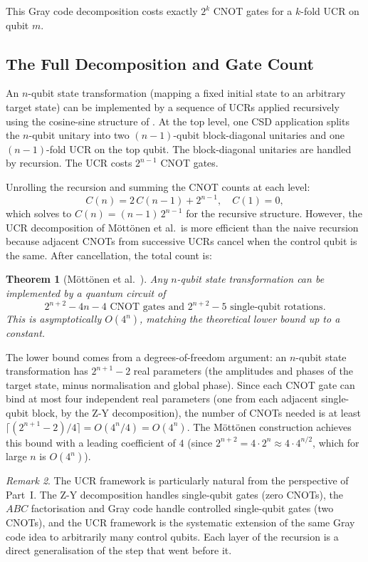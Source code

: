 \documentclass[12pt, a4paper, oneside]{report}
\theoremstyle{plain}
\newtheorem{theorem}{Theorem}[chapter]
\theoremstyle{definition}
\theoremstyle{remark}
\newtheorem{remark}[theorem]{Remark}
\begin{document}
This Gray code decomposition costs exactly $2^k$ CNOT gates for a $k$-fold UCR on qubit $m$.

\subsection{The Full Decomposition and Gate Count}

An $n$-qubit state transformation (mapping a fixed initial state to an arbitrary target
state) can be implemented by a sequence of UCRs applied recursively using the cosine-sine
structure of . At the top level, one CSD application splits the $n$-qubit
unitary into two $(n-1)$-qubit block-diagonal unitaries and one $(n-1)$-fold UCR on the
top qubit. The block-diagonal unitaries are handled by recursion. The UCR costs $2^{n-1}$
CNOT gates.

Unrolling the recursion and summing the CNOT counts at each level:
\[
  C(n) = 2\,C(n-1) + 2^{n-1}, \quad C(1) = 0,
\]
which solves to $C(n) = (n-1)\,2^{n-1}$ for the recursive structure. However, the UCR
decomposition of Möttönen et al.\ is more efficient than the naive recursion because
adjacent CNOTs from successive UCRs cancel when the control qubit is the same. After
cancellation, the total count is:

\begin{theorem}[Möttönen et al.~\cite{mottonen2004}]
\label{thm:mottonen}
Any $n$-qubit state transformation can be implemented by a quantum circuit of
\[
  2^{n+2} - 4n - 4 \text{ CNOT gates and } 2^{n+2} - 5 \text{ single-qubit rotations.}
\]
This is asymptotically $O(4^n)$, matching the theoretical lower bound up to a constant.
\end{theorem}

The lower bound comes from a degrees-of-freedom argument: an $n$-qubit state transformation
has $2^{n+1} - 2$ real parameters (the amplitudes and phases of the target state, minus
normalisation and global phase). Since each CNOT gate can bind at most four independent
real parameters (one from each adjacent single-qubit block, by the Z-Y decomposition), the
number of CNOTs needed is at least $\lceil(2^{n+1} - 2)/4\rceil = O(4^n/4) = O(4^n)$.
The Möttönen construction achieves this bound with a leading coefficient of $4$ (since
$2^{n+2} = 4 \cdot 2^n \approx 4 \cdot 4^{n/2}$, which for large $n$ is $O(4^n)$).

\begin{remark}
The UCR framework is particularly natural from the perspective of Part~I. The Z-Y
decomposition handles single-qubit gates (zero CNOTs), the $ABC$ factorisation and Gray
code handle controlled single-qubit gates (two CNOTs), and the UCR framework is the
systematic extension of the same Gray code idea to arbitrarily many control qubits. Each
layer of the recursion is a direct generalisation of the step that went before it.
\end{remark}
\end{document}
